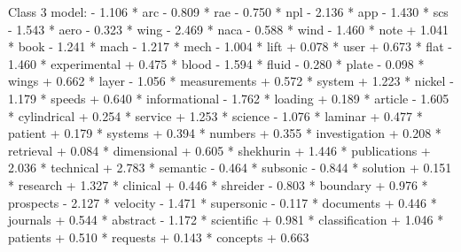 Class 3 model:
- 1.106 * arc - 0.809 * rae - 0.750 * npl - 2.136 * app - 1.430 * scs - 1.543 * aero - 0.323 * wing - 2.469 * naca - 0.588 * wind - 1.460 * note + 1.041 * book - 1.241 * mach - 1.217 * mech - 1.004 * lift + 0.078 * user + 0.673 * flat - 1.460 * experimental + 0.475 * blood - 1.594 * fluid - 0.280 * plate - 0.098 * wings + 0.662 * layer - 1.056 * measurements + 0.572 * system + 1.223 * nickel - 1.179 * speeds + 0.640 * informational - 1.762 * loading + 0.189 * article - 1.605 * cylindrical + 0.254 * service + 1.253 * science - 1.076 * laminar + 0.477 * patient + 0.179 * systems + 0.394 * numbers + 0.355 * investigation + 0.208 * retrieval + 0.084 * dimensional + 0.605 * shekhurin + 1.446 * publications + 2.036 * technical + 2.783 * semantic - 0.464 * subsonic - 0.844 * solution + 0.151 * research + 1.327 * clinical + 0.446 * shreider - 0.803 * boundary + 0.976 * prospects - 2.127 * velocity - 1.471 * supersonic - 0.117 * documents + 0.446 * journals + 0.544 * abstract - 1.172 * scientific + 0.981 * classification + 1.046 * patients + 0.510 * requests + 0.143 * concepts + 0.663

